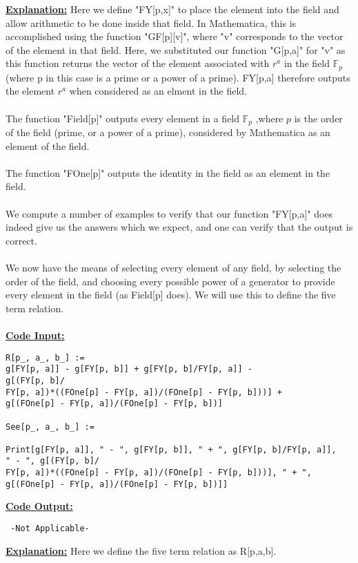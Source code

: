 \documentclass[11pt]{article}
\theoremstyle{plain}
\theoremstyle{definition}
\begin{document}
\textbf{\underline{Explanation:}} Here we define "FY[p,x]" to place the element into the field and allow arithmetic to be done inside that field. In Mathematica, this is accomplished using the function "GF[p][v]", where "v" corresponds to the vector of the element in that field. Here, we substituted our function "G[p,a]" for "v" as this function returns the vector of the element associated with $r^a$ in the field $\mathbb{F}_p$ (where p in this case is a prime or a power of a prime). FY[p,a] therefore outputs the element $r^a$ when considered as an elment in the field.\\
\\
The function "Field[p]" outputs every element in a field $\mathbb{F}_p$ ,where $p$ is the order of the field (prime, or a power of a prime), considered by Mathematica as an element of the field.\\
\\
The function "FOne[p]" outputs the identity in the field as an element in the field. \\
\\
We compute a number of examples to verify that our function "FY[p,a]" does indeed give us the answers which we expect, and one can verify that the output is correct.\\
\\
We now have the means of selecting every element of any field, by selecting the order of the field, and choosing every possible power of a generator to provide every element in the field (as Field[p] does). We will use this to define the five term relation.\\
\\
\textbf{\underline{Code Input:}}
\begin{verbatim}
R[p_, a_, b_] := 
g[FY[p, a]] - g[FY[p, b]] + g[FY[p, b]/FY[p, a]] - 
g[(FY[p, b]/
FY[p, a])*((FOne[p] - FY[p, a])/(FOne[p] - FY[p, b]))] + 
g[(FOne[p] - FY[p, a])/(FOne[p] - FY[p, b])]

See[p_, a_, b_] :=

Print[g[FY[p, a]], " - ", g[FY[p, b]], " + ", g[FY[p, b]/FY[p, a]], 
" - ", g[(FY[p, b]/
FY[p, a])*((FOne[p] - FY[p, a])/(FOne[p] - FY[p, b]))], " + ", 
g[(FOne[p] - FY[p, a])/(FOne[p] - FY[p, b])]] 
\end{verbatim}
\textbf{\underline{Code Output:}}
\begin{verbatim}
 -Not Applicable-
\end{verbatim}
\textbf{\underline{Explanation:}} Here we define the five term relation as R[p,a,b].\\
\end{document}
